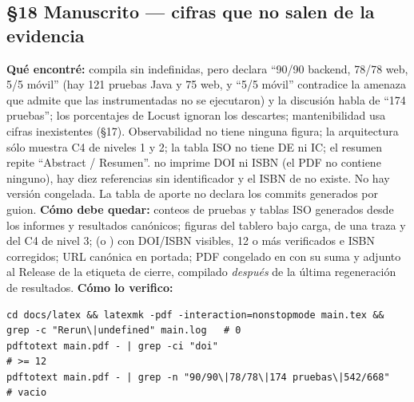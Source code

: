 \subsection*{\S18 Manuscrito --- cifras que no salen de la evidencia}
\textbf{Qu\'e encontr\'e:} compila sin indefinidas, pero  declara ``90/90 backend, 78/78 web, 5/5 m\'ovil'' (hay 121 pruebas Java y 75 web, y ``5/5 m\'ovil'' contradice la amenaza que admite que las instrumentadas no se ejecutaron) y la discusi\'on habla de ``174 pruebas''; los porcentajes de Locust ignoran los descartes; mantenibilidad usa cifras inexistentes (\S17). Observabilidad no tiene ninguna figura; la arquitectura s\'olo muestra C4 de niveles 1 y 2; la tabla ISO no tiene DE ni IC; el resumen repite ``Abstract / Resumen''.  no imprime DOI ni ISBN (el PDF no contiene ninguno), hay diez referencias sin identificador y el ISBN de  no existe. No hay versi\'on congelada. La tabla de aporte no declara los commits generados por guion. \textbf{C\'omo debe quedar:} conteos de pruebas y tablas ISO generados desde los informes y resultados can\'onicos; figuras del tablero bajo carga, de una traza y del C4 de nivel 3;  (o ) con DOI/ISBN visibles, 12 o m\'as verificados e ISBN corregidos; URL can\'onica en portada; PDF congelado en  con su suma y adjunto al Release de la etiqueta de cierre, compilado \emph{despu\'es} de la \'ultima regeneraci\'on de resultados. \textbf{C\'omo lo verifico:}\begin{verbatim}
cd docs/latex && latexmk -pdf -interaction=nonstopmode main.tex && grep -c "Rerun\|undefined" main.log   # 0
pdftotext main.pdf - | grep -ci "doi"                                                                 # >= 12
pdftotext main.pdf - | grep -n "90/90\|78/78\|174 pruebas\|542/668"                                   # vacio
\end{verbatim}

